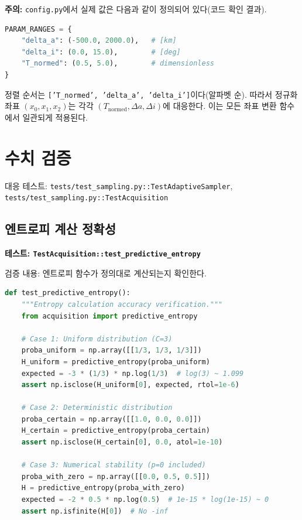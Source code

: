\documentclass[11pt]{article}
\begin{document}
\textbf{주의:} \texttt{config.py}에서 실제 값은 다음과 같이 정의되어 있다(코드 확인 결과).

\begin{lstlisting}[language=Python]
PARAM_RANGES = {
    "delta_a": (-500.0, 2000.0),   # [km]
    "delta_i": (0.0, 15.0),        # [deg]
    "T_normed": (0.5, 5.0),        # dimensionless
}
\end{lstlisting}

정렬 순서는 \texttt{['T\_normed', 'delta\_a', 'delta\_i']}이다(알파벳 순). 따라서 정규화 좌표 $(x_0, x_1, x_2)$는 각각 $(T_{\text{normed}}, \Delta a, \Delta i)$에 대응한다. 이는 모든 좌표 변환 함수에서 일관되게 적용된다.


\section{수치 검증}

대응 테스트: \texttt{tests/test\_sampling.py::TestAdaptiveSampler}, \texttt{tests/test\_sampling.py::TestAcquisition}

\subsection{엔트로피 계산 정확성}

\textbf{테스트: \texttt{TestAcquisition::test\_predictive\_entropy}}

검증 내용: 엔트로피 함수가 정의대로 계산되는지 확인한다.

\begin{lstlisting}[language=Python]
def test_predictive_entropy():
    """Entropy calculation accuracy verification."""
    from acquisition import predictive_entropy

    # Case 1: Uniform distribution (C=3)
    proba_uniform = np.array([[1/3, 1/3, 1/3]])
    H_uniform = predictive_entropy(proba_uniform)
    expected = -3 * (1/3) * np.log(1/3)  # log(3) ~ 1.099
    assert np.isclose(H_uniform[0], expected, rtol=1e-6)

    # Case 2: Deterministic distribution
    proba_certain = np.array([[1.0, 0.0, 0.0]])
    H_certain = predictive_entropy(proba_certain)
    assert np.isclose(H_certain[0], 0.0, atol=1e-10)

    # Case 3: Numerical stability (p=0 included)
    proba_with_zero = np.array([[0.0, 0.5, 0.5]])
    H = predictive_entropy(proba_with_zero)
    expected = -2 * 0.5 * np.log(0.5)  # 1e-15 * log(1e-15) ~ 0
    assert np.isfinite(H[0])  # No -inf
\end{lstlisting}
\end{document}
